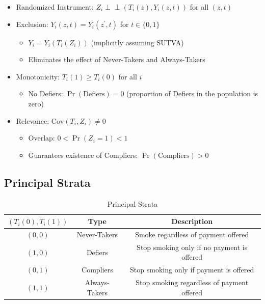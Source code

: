 \documentclass[11pt]{exam}
\theoremstyle{plain}
\newcommand{\ind}{\mbox{$\perp\!\!\!\perp$}}
\newcommand{\Cov}{\mathrm{Cov}}
\begin{document}
\begin{itemize} 
    \item Randomized Instrument: $Z_i \ind (T_i(z), Y_i(z, t))$ for all $(z, t)$
    \item Exclusion: $Y_i(z, t) = Y_i(z^\prime, t)$ for $t \in \{0, 1\}$
    \begin{itemize}
        \item $Y_i = Y_i(T_i(Z_i))$ (implicitly assuming SUTVA)
        \item Eliminates the effect of Never-Takers and Always-Takers
    \end{itemize}    
    \item Monotonicity:  $T_i(1) \geq T_i(0)$ for all $i$
    \begin{itemize}
        \item No Defiers: $\Pr(\text{Defiers}) = 0$ (proportion of Defiers in the population is zero)
    \end{itemize}
    \item Relevance: $\Cov(T_i, Z_i) \neq 0$
    \begin{itemize}
        \item Overlap: $0 < \Pr(Z_i = 1) < 1$
        \item Guarantees existence of Compliers: $\Pr(\text{Compliers}) > 0$
    \end{itemize}
\end{itemize}

\subsection{Principal Strata}
\begin{table}[h]
    \centering
    \begin{tabular}{|c|c|c|}
        \hline
         $(T_i(0), T_i(1))$ & Type & Description\\ \hline
         $(0, 0)$& Never-Takers & Smoke regardless of payment offered \\ \hline
         $(1, 0)$& Defiers &  Stop smoking only if no payment is offered \\ \hline
         $(0, 1)$& Compliers & Stop smoking only if payment is offered  \\ \hline
         $(1, 1)$& Always-Takers & Stop smoking regardless of payment offered \\ \hline
    \end{tabular}
    \caption{Principal Strata}
    \label{tab:principal_strata}
\end{table}
\end{document}
